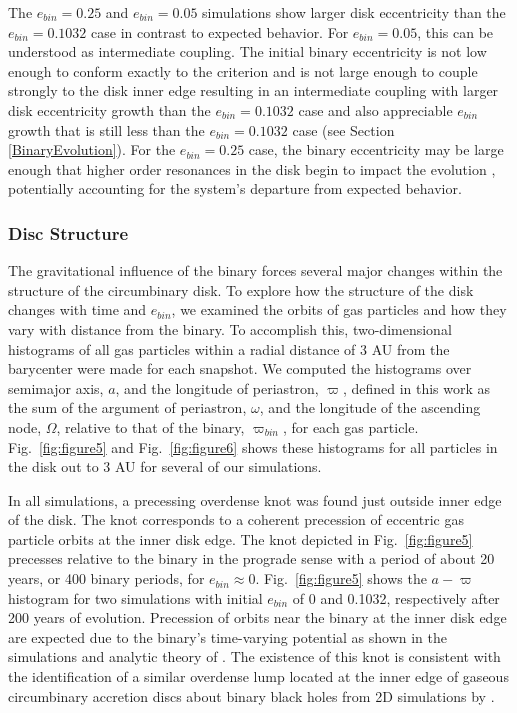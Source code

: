 The $e_{bin} = 0.25$ and $e_{bin} = 0.05$ simulations show larger disk eccentricity than
the $e_{bin} = 0.1032$ case in contrast to expected behavior.  For
$e_{bin} = 0.05$, this can be understood as intermediate coupling.
The initial binary eccentricity is not low enough to conform exactly
to the \citet{Papaloizou01} criterion and is not large enough to
couple strongly to the disk inner edge resulting in an intermediate
coupling with larger disk eccentricity growth than the $e_{bin} = 0.1032$ case and also
appreciable $e_{bin}$ growth that is still less than the $e_{bin} = 0.1032$ case (see Section \ref{BinaryEvolution}).  For
the $e_{bin} = 0.25$ case, the binary eccentricity may be large enough that higher order resonances in the disk begin to impact the evolution \citep{Artymowicz1992}, potentially accounting for the system's departure from expected behavior.


\subsubsection{Disc Structure} \label{discStructEvolution}

The gravitational influence of the binary forces several major changes within the structure of the circumbinary disk.  To explore how the
structure of the disk changes with time and $e_{bin}$, we examined the orbits of gas
particles and how they vary with distance from the binary.  To
accomplish this, two-dimensional histograms of all gas particles
within a radial distance of 3 AU from the barycenter were made for
each snapshot.  We computed the histograms over semimajor
axis, $a$, and the longitude of periastron, $\varpi$, defined in this
work as the sum of the argument of periastron, $\omega$, and the
longitude of the ascending node, $\Omega$, relative to that of the binary, $\varpi_{bin}$, for each gas particle. 
Fig.~\ref{fig:figure5} and Fig.~\ref{fig:figure6} shows these histograms
for all particles in the disk out to 3 AU
for several of our simulations.

In all simulations, a precessing overdense knot was found just outside
inner edge of the disk.  The knot corresponds to a coherent precession
of eccentric gas particle orbits at the inner disk edge.  The knot
depicted in Fig.~\ref{fig:figure5} precesses relative to the binary
in the prograde sense with a period of about 20 years, or 400 binary
periods, for $e_{bin} \approx 0$.
Fig.~\ref{fig:figure5} shows the $a - \varpi$ histogram 
for two simulations with initial $e_{bin}$ of 0 and 0.1032,
respectively after 200 years of evolution.
Precession of orbits near the binary at the inner disk edge are expected due to the binary's time-varying potential as shown in the simulations and analytic theory of \citet{Arty2000}. The existence of this knot is consistent with the identification of a similar overdense lump located at the inner edge of 
gaseous circumbinary accretion discs about binary black holes from 2D simulations by \citet{Farris2014}.

